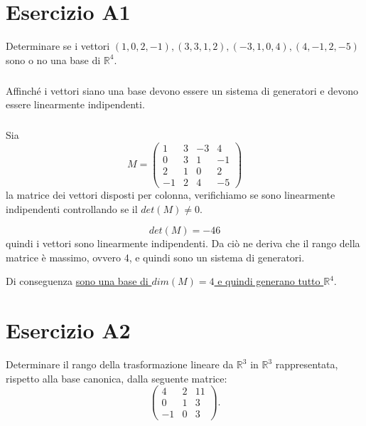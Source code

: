 \documentclass[a4paper]{report}
\newenvironment{problem}
        {
                \begin{mdframed}[topline=false,rightline=false,bottomline=false]
                        \slshape
        }
        {
                \end{mdframed}
        }
\begin{document}
        \chapter*{Esercizio A1}
        \begin{problem}
                Determinare se i vettori $ (1,0,2,-1),(3,3,1,2),(-3,1,0,4),(4,-1,2,-5) $ sono o no una base di $\mathbb{R}^4$.
        \end{problem}

        \paragraph{}
        Affinch\'{e} i vettori siano una base devono essere un sistema di generatori e devono essere linearmente indipendenti.

        \paragraph{}
        Sia
        \[
                M = \begin{pmatrix}
                        1 & 3 & -3 & 4 \\
                        0 & 3 & 1 & -1 \\
                        2 & 1 & 0 & 2  \\
                        -1  & 2 & 4 & -5
                \end{pmatrix}
        \]
        la matrice dei vettori disposti per colonna,
        verifichiamo se sono linearmente indipendenti controllando se il $ det(M) \not= 0 $.

        \[
                det(M) = -46
        \]
        quindi i vettori sono linearmente indipendenti.
        Da ci\`{o} ne deriva che il rango della matrice \`{e} massimo, ovvero 4,
        e quindi sono un sistema di generatori.

        Di conseguenza \ul{sono una base di $ dim(M) = 4 $ e quindi generano tutto $\mathbb{R}^4$}.


        \chapter*{Esercizio A2}
        \begin{problem}
                Determinare il rango della trasformazione lineare da $\mathbb{R}^3$ in $\mathbb{R}^3$ rappresentata, rispetto alla base canonica, dalla seguente matrice:
                \[
                        \begin{pmatrix}
                               4 & 2 & 11 \\
                               0 & 1 & 3 \\
                               -1 & 0 & 3
                        \end{pmatrix}.
                \]
        \end{problem}
\end{document}
